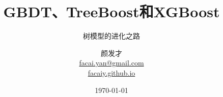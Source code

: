 
\title{GBDT、TreeBoost和XGBoost}
\subtitle{树模型的进化之路}
\author{颜发才 \\
        \href{mailto:facai.yan@gmail.com}{\tiny facai.yan@gmail.com} \\[-1ex]
        \href{https://facaiy.github.io}{\tiny facaiy.github.io}}
\date{\today}
